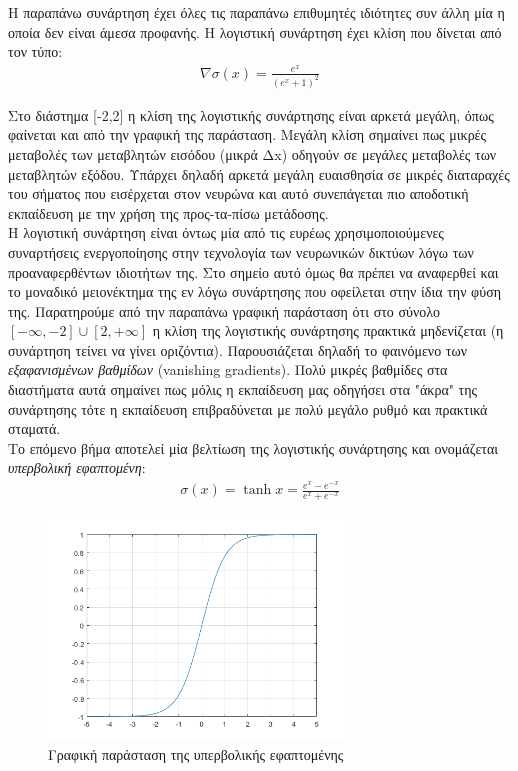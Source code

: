 \documentclass[11pt]{article} %
\numberwithin{equation}{subsection}
\begin{document}
Η παραπάνω συνάρτηση έχει όλες τις παραπάνω επιθυμητές ιδιότητες συν άλλη μία η οποία δεν είναι άμεσα προφανής. H λογιστική συνάρτηση έχει κλίση που δίνεται από τον τύπο:
\begin{align*}
\nabla \sigma(x) = \frac{e^x}{(e^x + 1)^2}
\end{align*}

 Στο διάστημα [-2,2] η κλίση της λογιστικής συνάρτησης είναι αρκετά μεγάλη, όπως φαίνεται και από την γραφική της παράσταση. Μεγάλη κλίση σημαίνει πως μικρές μεταβολές των μεταβλητών εισόδου (μικρά Δx) οδηγούν σε μεγάλες μεταβολές των μεταβλητών εξόδου. Υπάρχει δηλαδή αρκετά μεγάλη ευαισθησία σε μικρές διαταραχές του σήματος που εισέρχεται στον νευρώνα και αυτό συνεπάγεται πιο αποδοτική εκπαίδευση με την χρήση της προς-τα-πίσω μετάδοσης. \\

Η λογιστική συνάρτηση είναι όντως μία από τις ευρέως χρησιμοποιούμενες συναρτήσεις ενεργοποίησης στην τεχνολογία των νευρωνικών δικτύων λόγω των προαναφερθέντων ιδιοτήτων της. Στο σημείο αυτό όμως θα πρέπει να αναφερθεί και το μοναδικό μειονέκτημα της εν λόγω συνάρτησης που οφείλεται στην ίδια την φύση της. Παρατηρούμε από την παραπάνω γραφική παράσταση ότι στο σύνολο $[-\infty,-2] \cup [2, +\infty]$ η κλίση της λογιστικής συνάρτησης πρακτικά μηδενίζεται (η συνάρτηση τείνει να γίνει οριζόντια). Παρουσιάζεται δηλαδή το φαινόμενο των \textit{εξαφανισμένων βαθμίδων} (vanishing gradients). Πολύ μικρές βαθμίδες στα διαστήματα αυτά σημαίνει πως μόλις η εκπαίδευση μας οδηγήσει στα "άκρα" της συνάρτησης τότε η εκπαίδευση επιβραδύνεται με πολύ μεγάλο ρυθμό και πρακτικά σταματά.\\

Το επόμενο βήμα αποτελεί μία βελτίωση της λογιστικής συνάρτησης και ονομάζεται \textit{υπερβολική εφαπτομένη}:
\begin{align*}
\sigma(x) = \tanh{x} = \frac{e^x - e^{-x}}{e^x + e^{-x}}
\end{align*}

\begin{figure}[H]
    \centering
    \includegraphics[width=0.7\textwidth]{tanh}
    \caption{Γραφική παράσταση της υπερβολικής εφαπτομένης}
    \label{fig:tanh curve}
\end{figure}
\end{document}
